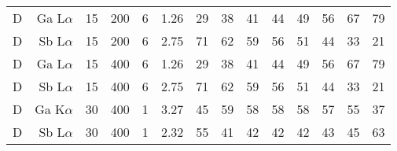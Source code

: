 \begin{table}[phtb]
\begin{center}
\begin{tabular}{rrrrrrrrrrrrrr}
            \hline
            D            & Ga L$\alpha$  & 15             & 200            & 6           & 1.26              & 29             & 38           & 41            & 44             & 49             & 56             & 67            & 79             \\
            D            & Sb L$\alpha$  & 15             & 200            & 6           & 2.75              & 71             & 62           & 59            & 56             & 51             & 44             & 33            & 21             \\
            D            & Ga L$\alpha$  & 15             & 400            & 6           & 1.26              & 29             & 38           & 41            & 44             & 49             & 56             & 67            & 79             \\
            D            & Sb L$\alpha$  & 15             & 400            & 6           & 2.75              & 71             & 62           & 59            & 56             & 51             & 44             & 33            & 21             \\
            D            & Ga K$\alpha$  & 30             & 400            & 1           & 3.27              & 45             & 59           & 58            & 58             & 58             & 57             & 55            & 37             \\
            D            & Sb L$\alpha$  & 30             & 400            & 1           & 2.32              & 55             & 41           & 42            & 42             & 42             & 43             & 45            & 63             \\
            \hline
        \end{tabular}
    \end{center}
\end{table}
\restoregeometry %

